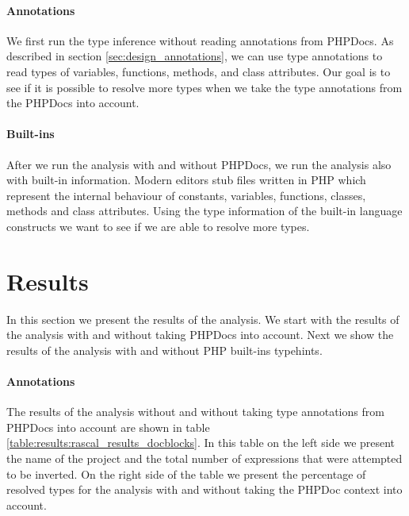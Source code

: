 \documentclass[../main.tex]{subfiles}
\begin{document}
	\paragraph{Annotations}
	We first run the type inference without reading annotations from PHPDocs.
	As described in section \ref{sec:design_annotations}, we can use type annotations to read types of variables, functions, methods, and class attributes.
	Our goal is to see if it is possible to resolve more types when we take the type annotations from the PHPDocs into account.
	
	\paragraph{Built-ins}
	After we run the analysis with and without PHPDocs, we run the analysis also with built-in information.
	Modern editors stub files written in PHP which represent the internal behaviour of constants, variables, functions, classes, methods and class attributes.
	Using the type information of the built-in language constructs we want to see if we are able to resolve more types.
			
	\section{Results}\label{sec:evaluation_results}
	
	In this section we present the results of the analysis.
	We start with the results of the analysis with and without taking PHPDocs into account.
	Next we show the results of the analysis with and without PHP built-ins typehints.

	\paragraph{Annotations}
	The results of the analysis without and without taking type annotations from PHPDocs into account are shown in table \ref{table:results:rascal_results_docblocks}.
	In this table on the left side we present the name of the project and the total number of expressions that were attempted to be inverted.
	On the right side of the table we present the percentage of resolved types for the analysis with and without taking the PHPDoc context into account.
\end{document}
